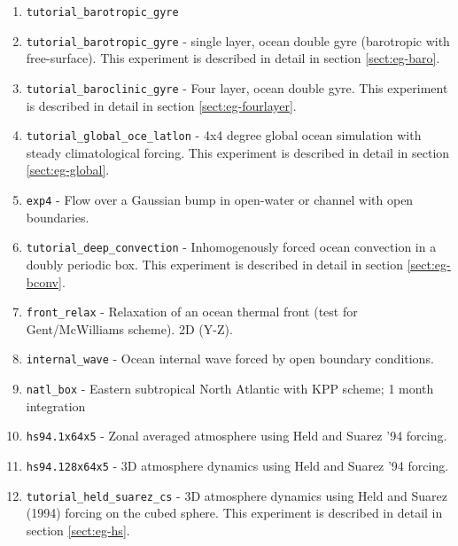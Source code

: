 \begin{enumerate}
  
\item \texttt{tutorial\_barotropic\_gyre}

\item \texttt{tutorial\_barotropic\_gyre} - single layer, ocean double gyre 
  (barotropic with free-surface). This experiment is described in detail in section
  \ref{sect:eg-baro}.

\item \texttt{tutorial\_baroclinic\_gyre} - Four layer, ocean double gyre. This experiment
  is described in detail in section \ref{sect:eg-fourlayer}.

\item \texttt{tutorial\_global\_oce\_latlon} - 4x4 degree global ocean simulation with steady
  climatological forcing. This experiment is described in detail in section \ref{sect:eg-global}.

\item \texttt{exp4} - Flow over a Gaussian bump in open-water or channel with open boundaries.
  
\item \texttt{tutorial\_deep\_convection} - Inhomogenously forced ocean convection in a
  doubly periodic box. This experiment is described in detail in section \ref{sect:eg-bconv}.

\item \texttt{front\_relax} - Relaxation of an ocean thermal front (test for
Gent/McWilliams scheme). 2D (Y-Z).

\item \texttt{internal\_wave} - Ocean internal wave forced by open
  boundary conditions.
  
\item \texttt{natl\_box} - Eastern subtropical North Atlantic with KPP
  scheme; 1 month integration
  
\item \texttt{hs94.1x64x5} - Zonal averaged atmosphere using Held and
  Suarez '94 forcing.
  
\item \texttt{hs94.128x64x5} - 3D atmosphere dynamics using Held and
  Suarez '94 forcing.
  
\item \texttt{tutorial\_held\_suarez\_cs} - 3D atmosphere dynamics using Held and Suarez 
  (1994) forcing on the cubed sphere.  This experiment is described in detail in
  section \ref{sect:eg-hs}.
  

\end{enumerate}
